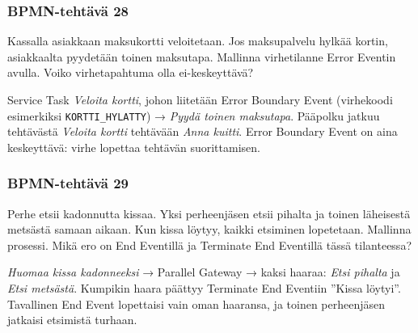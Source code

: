 \documentclass[
  finnish,
  letterpaper,
  DIV=11,
  numbers=noendperiod,
  oneside]{scrreprt}
\begin{document}
\subsubsection{BPMN-tehtävä 28}\label{bpmn-tehtuxe4vuxe4-28}

Kassalla asiakkaan maksukortti veloitetaan. Jos maksupalvelu hylkää
kortin, asiakkaalta pyydetään toinen maksutapa. Mallinna virhetilanne
Error Eventin avulla. Voiko virhetapahtuma olla ei-keskeyttävä?

\begin{tcolorbox}[enhanced jigsaw, arc=.35mm, bottomrule=.15mm, bottomtitle=1mm, breakable, colback=white, colbacktitle=quarto-callout-tip-color!10!white, colframe=quarto-callout-tip-color-frame, coltitle=black, left=2mm, leftrule=.75mm, opacityback=0, opacitybacktitle=0.6, rightrule=.15mm, title=\textcolor{quarto-callout-tip-color}{\faLightbulb}\hspace{0.5em}{Malliratkaisu}, titlerule=0mm, toprule=.15mm, toptitle=1mm]

Service Task \emph{Veloita kortti}, johon liitetään Error Boundary Event
(virhekoodi esimerkiksi \texttt{KORTTI\_HYLATTY}) → \emph{Pyydä toinen
maksutapa}. Pääpolku jatkuu tehtävästä \emph{Veloita kortti} tehtävään
\emph{Anna kuitti}. Error Boundary Event on aina keskeyttävä: virhe
lopettaa tehtävän suorittamisen.

\end{tcolorbox}

\subsubsection{BPMN-tehtävä 29}\label{bpmn-tehtuxe4vuxe4-29}

Perhe etsii kadonnutta kissaa. Yksi perheenjäsen etsii pihalta ja toinen
läheisestä metsästä samaan aikaan. Kun kissa löytyy, kaikki etsiminen
lopetetaan. Mallinna prosessi. Mikä ero on End Eventillä ja Terminate
End Eventillä tässä tilanteessa?

\begin{tcolorbox}[enhanced jigsaw, arc=.35mm, bottomrule=.15mm, bottomtitle=1mm, breakable, colback=white, colbacktitle=quarto-callout-tip-color!10!white, colframe=quarto-callout-tip-color-frame, coltitle=black, left=2mm, leftrule=.75mm, opacityback=0, opacitybacktitle=0.6, rightrule=.15mm, title=\textcolor{quarto-callout-tip-color}{\faLightbulb}\hspace{0.5em}{Malliratkaisu}, titlerule=0mm, toprule=.15mm, toptitle=1mm]

\emph{Huomaa kissa kadonneeksi} → Parallel Gateway → kaksi haaraa:
\emph{Etsi pihalta} ja \emph{Etsi metsästä}. Kumpikin haara päättyy
Terminate End Eventiin ''Kissa löytyi''. Tavallinen End Event lopettaisi
vain oman haaransa, ja toinen perheenjäsen jatkaisi etsimistä turhaan.

\end{tcolorbox}
\end{document}
